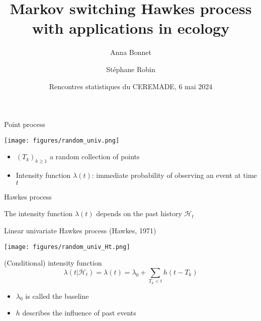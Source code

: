 \documentclass[french,english]{beamer}
\title[Modeling spatial interactions] %
{
Markov switching Hawkes process with applications in ecology
}
\institute[LPSM]{LPSM, Sorbonne Université}
\date{Rencontres statistiques du CEREMADE, 6 mai 2024}
\author{Anna Bonnet \and Stéphane Robin}
\begin{document}
\begin{frame}
\maketitle

\end{frame}


\begin{frame}{Point process}

\begin{minipage}{6cm}
\texttt{[image: figures/random\_univ.png]}
\end{minipage}
\begin{minipage}{4.5cm}
\begin{itemize}
\item $(T_k)_{k \geq 1}$ a random collection of points
\item Intensity function $\lambda(t)$: immediate probability of observing an event at time $t$
\end{itemize}
\end{minipage}

\vspace{0.5 cm}
\begin{block}{Hawkes process}
    \begin{itemize}
      The intensity function $\lambda(t)$ depends on the past history $\mathcal{H}_t$
    \end{itemize}
\end{block}



\end{frame}


\begin{frame}{Linear univariate Hawkes process (Hawkes, 1971)}

\vspace{2cm}

\texttt{[image: figures/random\_univ\_Ht.png]}


\begin{block}{(Conditional) intensity function}
$$\lambda(t \vert \mathcal{H}_t)= \lambda(t)= \lambda_0 + \underset{T_k < t}{\sum} h(t-T_k)$$
\end{block}



\begin{itemize}
\item $\lambda_0$ is called the baseline 
\item $h$ describes the influence of past events
\end{itemize}
\end{frame}
\end{document}
